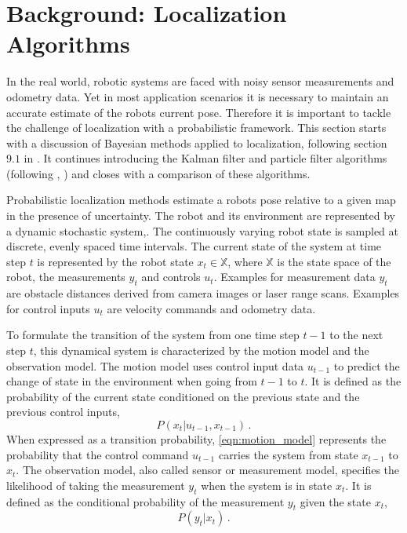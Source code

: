 \documentclass[10pt,journal,compsoc]{IEEEtran}
\begin{document}
\section{Background: Localization Algorithms}
\label{sec:background}
In the real world, robotic systems are faced with noisy sensor measurements and odometry data. Yet in most application scenarios it is necessary to maintain an accurate estimate of the robots current pose. Therefore it is important to tackle the challenge of localization with a probabilistic framework. This section starts with a discussion of Bayesian methods applied to localization, following section $9.1$ in \cite{principles_of_robot_motion}. It continues introducing the Kalman filter and particle filter algorithms (following \cite{principles_of_robot_motion}, \cite{monte_carlo_for_mobile_robots}) and closes with a comparison of these algorithms. 

Probabilistic localization methods estimate a robots pose relative to a given map in the presence of uncertainty. The robot and its environment are represented by a dynamic stochastic system,. The continuously varying robot state is sampled at discrete, evenly spaced time intervals. The current state of the system at time step $t$ is represented by the robot state $x_t \in \mathbb{X}$, where $\mathbb{X}$ is the state space of the robot, the measurements $y_t$ and controls $u_t$. Examples for measurement data $y_t$ are obstacle distances derived from camera images or laser range scans. Examples for control inputs $u_t$ are velocity commands and odometry data.

To formulate the transition of the system from one time step $t-1$ to the next step $t$, this dynamical system is characterized by the motion model and the observation model. The motion model uses control input data $u_{t-1}$ to predict the change of state in the environment when going from $t-1$ to $t$. It is defined as the probability of the current state conditioned on the previous state and the previous control inputs,
\begin{equation}
\label{eqn:motion_model}
P \left( x_t \vert u_{t-1}, x_{t-1} \right) \, .
\end{equation}
When expressed as a transition probability, \ref{eqn:motion_model} represents the probability that the control command $u_{t-1}$ carries the system from state $x_{t-1}$ to $x_t$. The observation model, also called sensor or measurement model, specifies the likelihood of taking the measurement $y_t$ when the system is in state $x_t$. It is defined as the conditional probability of the measurement $y_t$ given the state $x_t$, 
\begin{equation}
\label{eqn:observation_model}
P \left( y_t \vert x_t \right) \, .
\end{equation} 
\end{document}
